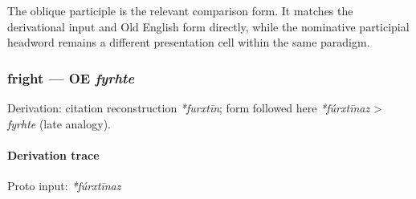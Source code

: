 \documentclass[
  british,
  a4paper,
]{article}
\begin{document}
The oblique participle is the relevant comparison form. It matches the
derivational input and Old English form directly, while the nominative
participial headword remains a different presentation cell within the
same paradigm.

\subsubsection{\texorpdfstring{fright --- OE
\emph{fyrhte}}{fright --- OE fyrhte}}\label{fright-oe-fyrhte}

Derivation: citation reconstruction \emph{*furxtīn}; form followed here
\emph{*fúrxtīnaz} \textgreater{} \emph{fyrhte} (late analogy).

\paragraph{Derivation trace}\label{derivation-trace-127}

Proto input: \emph{*fúrxtīnaz}

\begingroup
\setlength{\fboxsep}{6pt}
\end{document}
